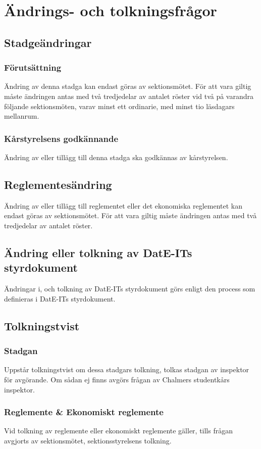 \documentclass[a4paper]{dtek}
\begin{document}
\section{Ändrings- och tolkningsfrågor}
\subsection{Stadgeändringar}
\subsubsection{Förutsättning}
Ändring av denna stadga kan endast göras av sektionsmötet. För att vara giltig måste ändringen antas med två tredjedelar av antalet röster vid två på varandra följande sektionsmöten, varav minst ett ordinarie, med minst tio läsdagars mellanrum.
\subsubsection{Kårstyrelsens godkännande}
Ändring av eller tillägg till denna stadga ska godkännas av kårstyrelsen.
\subsection{Reglementesändring}
Ändring av eller tillägg till reglementet eller det ekonomiska reglementet kan endast göras av sektionsmötet. För att vara giltig måste ändringen antas med två tredjedelar av antalet röster.
\subsection{Ändring eller tolkning av DatE-ITs styrdokument}
Ändringar i, och tolkning av DatE-ITs styrdokument görs enligt den process som definieras i DatE-ITs styrdokument.
\subsection{Tolkningstvist}
\subsubsection{Stadgan}
Uppstår tolkningstvist om dessa stadgars tolkning, tolkas stadgan av inspektor för avgörande. Om sådan ej finns avgörs frågan av Chalmers studentkårs inspektor.
\subsubsection{Reglemente \& Ekonomiskt reglemente}
Vid tolkning av reglemente eller ekonomiskt reglemente gäller, tills frågan avgjorts av sektionsmötet, sektionsstyrelsens tolkning.
\newpage
\end{document}
